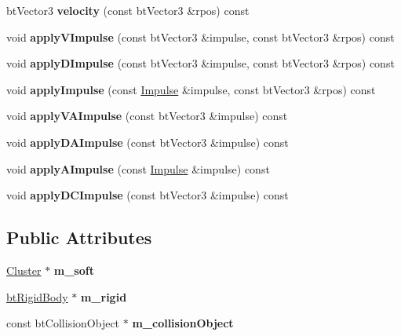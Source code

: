 \begin{DoxyCompactItemize}
bt\+Vector3 {\bfseries velocity} (const bt\+Vector3 \&rpos) const
\item 
\mbox{\label{structbtSoftBody_1_1Body_a2f51dd3b5049df32178645e56e9e1646}} 
void {\bfseries apply\+V\+Impulse} (const bt\+Vector3 \&impulse, const bt\+Vector3 \&rpos) const
\item 
\mbox{\label{structbtSoftBody_1_1Body_a7067f5b64302d7fe545089359f74a156}} 
void {\bfseries apply\+D\+Impulse} (const bt\+Vector3 \&impulse, const bt\+Vector3 \&rpos) const
\item 
\mbox{\label{structbtSoftBody_1_1Body_af575fcf038e9da6d46ee972f819d2d29}} 
void {\bfseries apply\+Impulse} (const \hyperlink{structbtSoftBody_1_1Impulse}{Impulse} \&impulse, const bt\+Vector3 \&rpos) const
\item 
\mbox{\label{structbtSoftBody_1_1Body_aa96b08a420e97b13c08e8fb3784e8d5c}} 
void {\bfseries apply\+V\+A\+Impulse} (const bt\+Vector3 \&impulse) const
\item 
\mbox{\label{structbtSoftBody_1_1Body_a86394a77d6d2ae91a78ba4c3da793e37}} 
void {\bfseries apply\+D\+A\+Impulse} (const bt\+Vector3 \&impulse) const
\item 
\mbox{\label{structbtSoftBody_1_1Body_adfbecf48af7e4075a9d20c74e24a5952}} 
void {\bfseries apply\+A\+Impulse} (const \hyperlink{structbtSoftBody_1_1Impulse}{Impulse} \&impulse) const
\item 
\mbox{\label{structbtSoftBody_1_1Body_a85a0387719e5eda388be266f721a1447}} 
void {\bfseries apply\+D\+C\+Impulse} (const bt\+Vector3 \&impulse) const
\end{DoxyCompactItemize}
\subsection*{Public Attributes}
\begin{DoxyCompactItemize}
\item 
\mbox{\label{structbtSoftBody_1_1Body_acf608ebad559d263cf5a26bff6b05aab}} 
\hyperlink{structbtSoftBody_1_1Cluster}{Cluster} $\ast$ {\bfseries m\+\_\+soft}
\item 
\mbox{\label{structbtSoftBody_1_1Body_a31bcf62f787a0c6c46bbf523fde8c640}} 
\hyperlink{classbtRigidBody}{bt\+Rigid\+Body} $\ast$ {\bfseries m\+\_\+rigid}
\item 
\mbox{\label{structbtSoftBody_1_1Body_afbc4164efc69fc199e26dda316f3f230}} 
const bt\+Collision\+Object $\ast$ {\bfseries m\+\_\+collision\+Object}
\end{DoxyCompactItemize}


